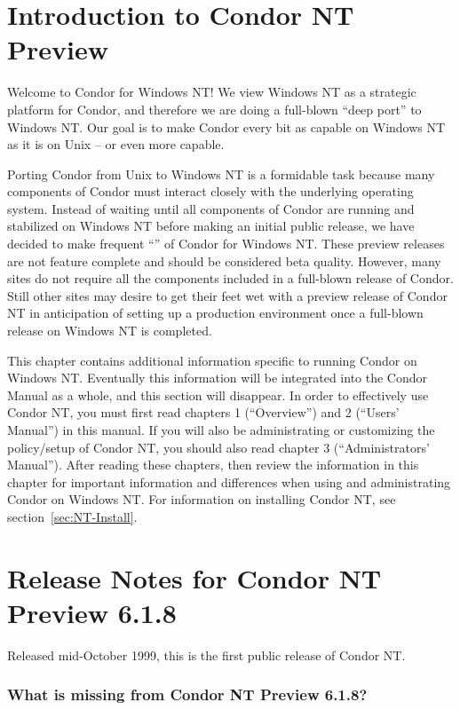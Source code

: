 
\section{Introduction to Condor NT Preview}

Welcome to Condor for Windows NT!  
We view Windows NT as a strategic platform for Condor, and therefore we are
doing a full-blown ``deep port'' to Windows NT.
Our goal is to make Condor every bit as capable on Windows NT as it is on
Unix -- or even more capable.  

Porting Condor from Unix to Windows NT is a formidable task because many
components of Condor must interact closely with the underlying operating
system.  Instead of waiting until all components of Condor are running and
stabilized on Windows NT before making an initial public release, we have
decided to make frequent ``'' of Condor for Windows
NT.  These preview releases are not feature complete and should be
considered beta quality.  However, many sites do not require all the
components included in a full-blown release of Condor.  Still other sites
may desire to get their feet wet with a preview release of Condor NT in
anticipation of setting up a production environment once a full-blown
release on Windows NT is completed.

This chapter contains additional information specific to running Condor on
Windows NT.  Eventually this information will be integrated into the Condor
Manual as a whole, and this section will disappear.  In order to effectively
use Condor NT, you must first read chapters 1 (``Overview'') and 2 (``Users'
Manual'') in this
manual.  If you will also be administrating or customizing the policy/setup of
Condor NT, you should also read chapter 3 (``Administrators' Manual'').
After reading these chapters, then review the information in this chapter
for important information and differences when using and administrating
Condor on Windows NT.  For information on installing Condor NT, see
section~\ref{sec:NT-Install}.


\section{Release Notes for Condor NT Preview 6.1.8}

Released mid-October 1999, this is the first public release of Condor NT.

\subsubsection{What is missing from Condor NT Preview 6.1.8?}

